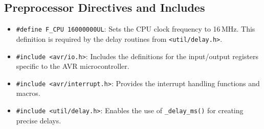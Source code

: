 \documentclass{article}
\theoremstyle{remark}
\begin{document}
\subsection{Preprocessor Directives and Includes}
\begin{itemize}[noitemsep]
    \item \texttt{\#define F\_CPU 16000000UL}: Sets the CPU clock frequency to 16\,MHz. This definition is required by the delay routines from \texttt{<util/delay.h>}.
    \item \texttt{\#include <avr/io.h>}: Includes the definitions for the input/output registers specific to the AVR microcontroller.
    \item \texttt{\#include <avr/interrupt.h>}: Provides the interrupt handling functions and macros.
    \item \texttt{\#include <util/delay.h>}: Enables the use of \texttt{\_delay\_ms()} for creating precise delays.
\end{itemize}
\end{document}
